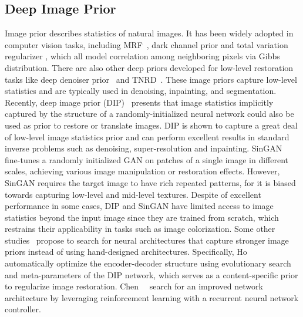 \subsection{Deep Image Prior}
Image prior describes statistics of natural images. It has been widely adopted in computer vision tasks, including 
MRF~\cite{roth2005fields,zhu1997prior,geman1984stochastic}, dark channel prior \cite{he2010single} and total variation regularizer \cite{rudin1992nonlinear}, which all model correlation among neighboring pixels via Gibbs distribution.
There are also other deep priors developed for low-level restoration tasks like deep denoiser prior~\cite{zhang2017learning, bigdeli2017deep} and TNRD~\cite{chen2016trainable}.
These image priors capture low-level statistics and are typically used in denoising, inpainting, and segmentation.
Recently, deep image prior (DIP)~\cite{ulyanov2018deep} presents that image statistics implicitly captured by the structure of a randomly-initialized neural network could also be used as prior to restore or translate images.
DIP is shown to capture a great deal of low-level image statistics prior and can perform excellent results in standard inverse problems such as denoising, super-resolution and inpainting.
SinGAN~\cite{shaham2019singan} fine-tunes a randomly initialized GAN on patches of a single image in different scales, achieving various image manipulation or restoration effects.
However, SinGAN requires the target image to have rich repeated patterns, for it is biased towards capturing low-level and mid-level textures.
Despite of excellent performance in some cases, DIP and SinGAN have limited access to image statistics beyond the input image since they are trained from scratch, which restrains their applicability in tasks such as image colorization.
Some other studies~\cite{ho2020neural,chen2020dip} propose to search for neural architectures that capture stronger image priors instead of using hand-designed architectures. Specifically,
Ho~\etal~\cite{ho2020neural} automatically optimize the encoder-decoder structure using evolutionary search and meta-parameters of the DIP network, which serves as a content-specific prior to regularize image restoration.
Chen~\etal~\cite{chen2020dip} search for an improved network architecture by leveraging reinforcement learning with a recurrent neural network controller.

